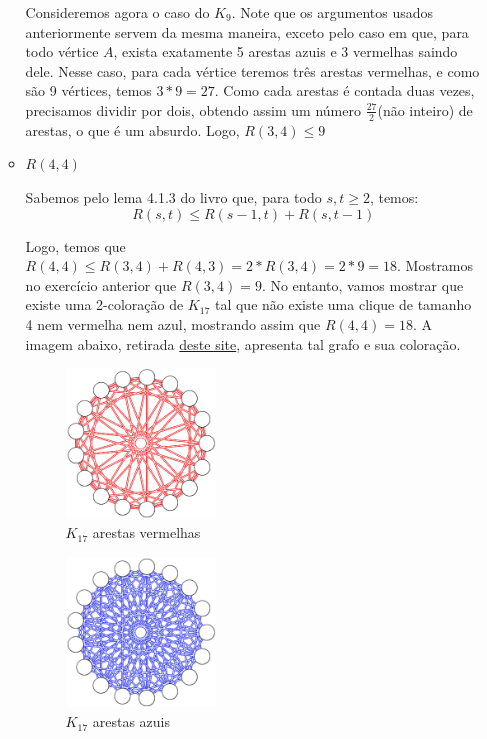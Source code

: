 \documentclass{article}
\begin{document}
\begin{itemize}
\begin{itemize}
		            Consideremos agora o caso do \(K_9\). Note que os argumentos usados anteriormente servem da mesma maneira, exceto pelo caso em que, para todo vértice \(A\),
		            exista exatamente 5 arestas azuis e 3 vermelhas saindo dele. Nesse caso, para cada vértice teremos três arestas vermelhas, e como são 9 vértices, temos \(3 * 9 = 27\). Como cada arestas
		            é contada duas vezes, precisamos dividir por dois, obtendo assim um número \(\frac{27}{2}\)(não inteiro) de arestas, o que é um absurdo. Logo, \(R(3, 4) \leq 9\)

		      \item \(R(4, 4)\)

		            Sabemos pelo lema 4.1.3 do livro que, para todo \(s, t \geq 2\), temos:
		            \[R(s, t) \leq R(s - 1, t) + R(s, t - 1)\]

		            Logo, temos que \(R(4, 4) \leq R(3, 4) + R(4, 3) = 2*R(3, 4) = 2*9 = 18\). Mostramos no exercício anterior
		            que \(R(3, 4) = 9\).
		            No entanto, vamos mostrar que existe uma 2-coloração de \(K_{17}\) tal que não existe uma clique de tamanho 4 nem vermelha nem azul, mostrando assim
		            que \(R(4, 4) = 18\). A imagem abaixo,
		            retirada \href{https://www.cut-the-knot.org/arithmetic/combinatorics/Ramsey44.shtml}{deste site}, apresenta tal grafo e sua coloração.

		            \begin{figure}[H]
			            \centering
			            \includegraphics[width=0.4\textwidth]{images/r441.jpeg}
			            \caption{\(K_{17}\) arestas vermelhas}
		            \end{figure}

		            \begin{figure}[H]
			            \centering
			            \includegraphics[width=0.4\textwidth]{images/r442.jpeg}
			            \caption{\(K_{17}\) arestas azuis}
		            \end{figure}


\end{itemize}
\end{itemize}
\end{document}
